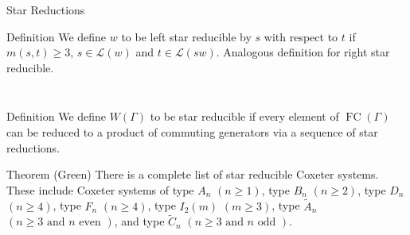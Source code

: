 \documentclass{beamer}
\DeclareMathOperator{\FC}{FC}
\newcommand{\LD}{\mathcal{L}}
\newcommand\heapblock[4]{\fill[fill=#4, fill opacity=0.35, draw=#4, line width=1.1pt, rounded corners,shift={(\xxaxis:#1)},shift={(\yyaxis:#2)}] (-1,-1) rectangle (1,1);\node at (#1,#2) {\footnotesize $#3$};}
\newcommand\dheapblock[4]{\draw[dotted, draw=#4, line width=1.1pt, rounded corners,shift={(\xxaxis:#1)},shift={(\yyaxis:#2)}] (-1,-1) rectangle (1,1);\node at (#1,#2) {\footnotesize $#3$};}
\newcommand\xxaxis{0}
\newcommand\yyaxis{90}
\begin{document}
\begin{frame}{Star Reductions}
\begin{block}{Definition}
	We define $w$ to be \alert{left star reducible by $s$ with respect to $t$} if $m(s,t) \geq 3$, $s \in \LD(w)$ and $ t \in \LD(sw)$. Analogous definition for \alert{right star reducible}.
\end{block}

\pause

\vspace{-1em}

\begin{columns}
\begin{column}{0.4\textwidth}
\begin{figure} \centering
{}
\end{figure}	
\end{column}
	
\begin{column}{0.4\textwidth}	
\begin{figure}
\end{figure}
\end{column}
\end{columns}

\pause

\begin{block}{Definition}
	We define $W(\Gamma)$ to be \alert{star reducible} if every element of $\FC(\Gamma)$ can be reduced to a product of commuting generators via a sequence of star reductions.
\end{block}

\pause

\begin{block}{Theorem (Green)}
	There is a complete list of star reducible Coxeter systems. These include Coxeter systems of type $A_n$ $(n \geq 1)$, type $B_n$ $(n \geq 2)$, type $D_n$ $(n \geq 4)$, type $F_n$ $(n \geq 4)$, type $I_2(m)$ $(m \geq 3)$, type $\widetilde{A}_{n}$ $(n \geq 3 \text{ and } n \text{ even })$, and type $\widetilde{C}_{n}$ $(n\geq 3 \text{ and } n \text{ odd })$.
\end{block}
	
\end{frame}
\end{document}
